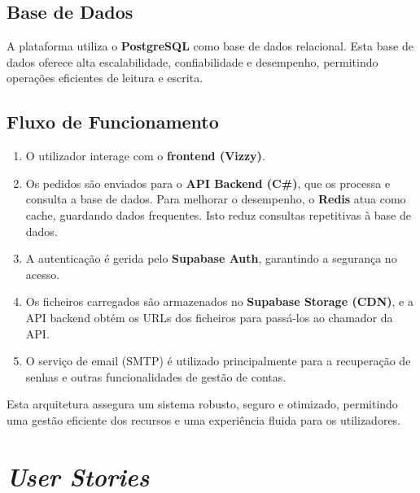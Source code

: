 \documentclass[a4paper, 12pt]{article} %
\begin{document}
\subsection{Base de Dados}
A plataforma utiliza o \textbf{PostgreSQL} como base de dados relacional. Esta base de dados oferece alta escalabilidade, confiabilidade e desempenho, permitindo operações eficientes de leitura e escrita.

\subsection{Fluxo de Funcionamento}
\begin{enumerate}
	\item O utilizador interage com o \textbf{frontend (Vizzy)}.
	\item Os pedidos são enviados para o \textbf{API Backend (C\#)}, que os processa e consulta a base de dados. Para melhorar o desempenho, o \textbf{Redis} atua como cache, guardando dados frequentes. Isto reduz consultas repetitivas à base de dados.
	\item A autenticação é gerida pelo \textbf{Supabase Auth}, garantindo a segurança no acesso.
	\item Os ficheiros carregados são armazenados no \textbf{Supabase Storage (CDN)}, e a API backend obtém os URLs dos ficheiros para passá-los ao chamador da API.
	\item O serviço de email (SMTP) é utilizado principalmente para a recuperação de senhas e outras funcionalidades de gestão de contas.
\end{enumerate}

Esta arquitetura assegura um sistema robusto, seguro e otimizado, permitindo uma gestão eficiente dos recursos e uma experiência fluida para os utilizadores.



\newpage
\section{\textit{User Stories}}
\end{document}
